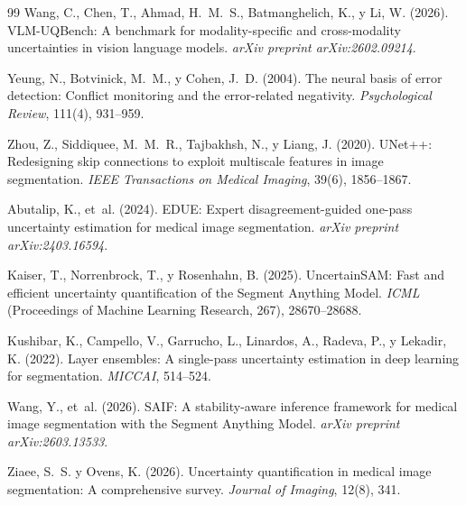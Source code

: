 \documentclass[12pt,a4paper]{article}
\begin{document}
\begin{thebibliography}{99}
Wang, C., Chen, T., Ahmad, H.~M.~S., Batmanghelich, K., y Li, W. (2026).
VLM-UQBench: A benchmark for modality-specific and cross-modality uncertainties in vision language models.
\emph{arXiv preprint arXiv:2602.09214}.

Yeung, N., Botvinick, M.~M., y Cohen, J.~D. (2004).
The neural basis of error detection: Conflict monitoring and the error-related negativity.
\emph{Psychological Review}, 111(4), 931--959.

Zhou, Z., Siddiquee, M.~M.~R., Tajbakhsh, N., y Liang, J. (2020).
UNet++: Redesigning skip connections to exploit multiscale features in image segmentation.
\emph{IEEE Transactions on Medical Imaging}, 39(6), 1856--1867.


Abutalip, K., et~al. (2024).
EDUE: Expert disagreement-guided one-pass uncertainty estimation for medical image segmentation.
\emph{arXiv preprint arXiv:2403.16594}.

Kaiser, T., Norrenbrock, T., y Rosenhahn, B. (2025).
UncertainSAM: Fast and efficient uncertainty quantification of the Segment Anything Model.
\emph{ICML} (Proceedings of Machine Learning Research, 267), 28670--28688.

Kushibar, K., Campello, V., Garrucho, L., Linardos, A., Radeva, P., y Lekadir, K. (2022).
Layer ensembles: A single-pass uncertainty estimation in deep learning for segmentation.
\emph{MICCAI}, 514--524.

Wang, Y., et~al. (2026).
SAIF: A stability-aware inference framework for medical image segmentation with the Segment Anything Model.
\emph{arXiv preprint arXiv:2603.13533}.

Ziaee, S.~S. y Ovens, K. (2026).
Uncertainty quantification in medical image segmentation: A comprehensive survey.
\emph{Journal of Imaging}, 12(8), 341.

\end{thebibliography}
\end{document}
